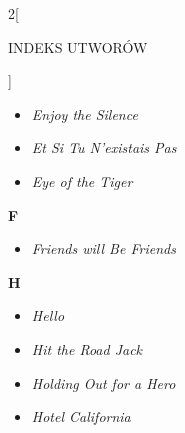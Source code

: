 \documentclass[a4paper]{report}
\begin{document}
\begin{multicols*}{2}[\begin{Huge}INDEKS UTWORÓW\end{Huge}\vspace{1cm}]
\begin{minipage}{\columnwidth}
\begin{itemize}[topsep=6pt, after=\vspace{5mm}, leftmargin=0mm]
		\itemsep0em
		\item[]\textit{Enjoy the Silence}  \\
		\item[]  \textit{Et Si Tu N'existais Pas}  \\
		\item[]  \textit{Eye of the Tiger}  \\
	\end{itemize}
\end{minipage}
\begin{minipage}{\columnwidth}
\begin{Large}
		\textbf{F}
	\end{Large} 
	\begin{itemize}[topsep=6pt, after=\vspace{5mm}, leftmargin=0mm]
		\itemsep0em
		\item[]\textit{Friends will Be Friends}  \\
	\end{itemize}
\end{minipage}
\begin{minipage}{\columnwidth}
\begin{Large}
		\textbf{H}
	\end{Large} 
	\begin{itemize}[topsep=6pt, after=\vspace{1.5mm}, leftmargin=0mm]
		\itemsep0em
		\item[]\textit{Hello}  \\
		\item[]  \textit{Hit the Road Jack}  \\
	\end{itemize}
\end{minipage}
\begin{minipage}{\columnwidth}
	\begin{itemize}[topsep=6pt, after=\vspace{1.5mm}, leftmargin=0mm]
		\itemsep0em
		\item[]  \textit{Holding Out for a Hero}  \\
	\end{itemize}
\end{minipage}
\begin{minipage}{\columnwidth}
	\begin{itemize}[topsep=6pt, after=\vspace{5mm}, leftmargin=0mm]
		\itemsep0em
		\item[]  \textit{Hotel California}  \\

\end{itemize}
\end{minipage}
\end{multicols*}
\end{document}
